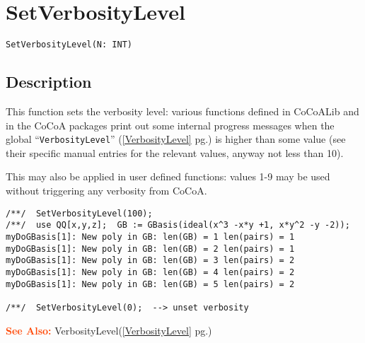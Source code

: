 \documentclass[a4paper]{mybook}
\newenvironment{command}{}{} %
\newcommand\SeeAlso{\par\textcolor{OrangeRed}{\textbf{\large See Also: }}}
\begin{document}
\section{SetVerbosityLevel}
\label{SetVerbosityLevel}
\begin{command} %


\begin{Verbatim}[label=syntax, rulecolor=\color{MidnightBlue},
frame=single]
SetVerbosityLevel(N: INT)
\end{Verbatim}


\subsection*{Description}

This function sets the verbosity level: various functions defined in
CoCoALib and in the CoCoA packages print out some internal progress
messages when the global ``\verb&VerbosityLevel&'' (\ref{VerbosityLevel} pg.\pageref{VerbosityLevel}) is higher than some
value (see their specific manual entries for the relevant values, anyway
not less than 10).
\par 
This may also be applied in user defined functions: values 1-9 may
be used without triggering any verbosity from CoCoA.
\begin{Verbatim}[label=example, rulecolor=\color{PineGreen}, frame=single]
/**/  SetVerbosityLevel(100);
/**/  use QQ[x,y,z];  GB := GBasis(ideal(x^3 -x*y +1, x*y^2 -y -2));
myDoGBasis[1]: New poly in GB: len(GB) = 1 len(pairs) = 1
myDoGBasis[1]: New poly in GB: len(GB) = 2 len(pairs) = 1
myDoGBasis[1]: New poly in GB: len(GB) = 3 len(pairs) = 2
myDoGBasis[1]: New poly in GB: len(GB) = 4 len(pairs) = 2
myDoGBasis[1]: New poly in GB: len(GB) = 5 len(pairs) = 2

/**/  SetVerbosityLevel(0);  --> unset verbosity
\end{Verbatim}


\SeeAlso %
  VerbosityLevel(\ref{VerbosityLevel} pg.\pageref{VerbosityLevel})
\end{command} %
\end{document}
